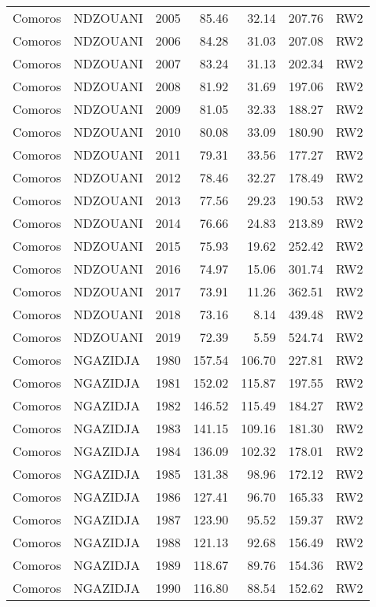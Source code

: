 \begin{longtable}{lllrrrl}
  Comoros & NDZOUANI & 2005 & 85.46 & 32.14 & 207.76 & RW2 \\ 
  Comoros & NDZOUANI & 2006 & 84.28 & 31.03 & 207.08 & RW2 \\ 
  Comoros & NDZOUANI & 2007 & 83.24 & 31.13 & 202.34 & RW2 \\ 
  Comoros & NDZOUANI & 2008 & 81.92 & 31.69 & 197.06 & RW2 \\ 
  Comoros & NDZOUANI & 2009 & 81.05 & 32.33 & 188.27 & RW2 \\ 
  Comoros & NDZOUANI & 2010 & 80.08 & 33.09 & 180.90 & RW2 \\ 
  Comoros & NDZOUANI & 2011 & 79.31 & 33.56 & 177.27 & RW2 \\ 
  Comoros & NDZOUANI & 2012 & 78.46 & 32.27 & 178.49 & RW2 \\ 
  Comoros & NDZOUANI & 2013 & 77.56 & 29.23 & 190.53 & RW2 \\ 
  Comoros & NDZOUANI & 2014 & 76.66 & 24.83 & 213.89 & RW2 \\ 
  Comoros & NDZOUANI & 2015 & 75.93 & 19.62 & 252.42 & RW2 \\ 
  Comoros & NDZOUANI & 2016 & 74.97 & 15.06 & 301.74 & RW2 \\ 
  Comoros & NDZOUANI & 2017 & 73.91 & 11.26 & 362.51 & RW2 \\ 
  Comoros & NDZOUANI & 2018 & 73.16 & 8.14 & 439.48 & RW2 \\ 
  Comoros & NDZOUANI & 2019 & 72.39 & 5.59 & 524.74 & RW2 \\ 
  Comoros & NGAZIDJA & 1980 & 157.54 & 106.70 & 227.81 & RW2 \\ 
  Comoros & NGAZIDJA & 1981 & 152.02 & 115.87 & 197.55 & RW2 \\ 
  Comoros & NGAZIDJA & 1982 & 146.52 & 115.49 & 184.27 & RW2 \\ 
  Comoros & NGAZIDJA & 1983 & 141.15 & 109.16 & 181.30 & RW2 \\ 
  Comoros & NGAZIDJA & 1984 & 136.09 & 102.32 & 178.01 & RW2 \\ 
  Comoros & NGAZIDJA & 1985 & 131.38 & 98.96 & 172.12 & RW2 \\ 
  Comoros & NGAZIDJA & 1986 & 127.41 & 96.70 & 165.33 & RW2 \\ 
  Comoros & NGAZIDJA & 1987 & 123.90 & 95.52 & 159.37 & RW2 \\ 
  Comoros & NGAZIDJA & 1988 & 121.13 & 92.68 & 156.49 & RW2 \\ 
  Comoros & NGAZIDJA & 1989 & 118.67 & 89.76 & 154.36 & RW2 \\ 
  Comoros & NGAZIDJA & 1990 & 116.80 & 88.54 & 152.62 & RW2 \\ 

\end{longtable}
